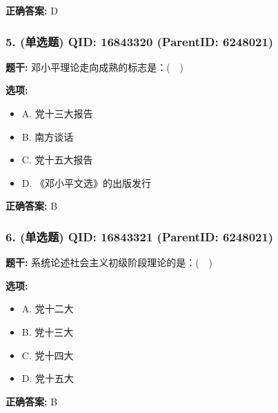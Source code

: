 \documentclass[12pt,UTF8]{ctexart}
\begin{document}
\textbf{正确答案:}
D

\vspace{0.3em}\hrulefill\vspace{0.7em}

\subsubsection*{5. (单选题) \small QID: 16843320 (ParentID: 6248021)}

\textbf{题干:}
邓小平理论走向成熟的标志是：(  )



\textbf{选项:}
\begin{itemize}[leftmargin=*]

  \item A. 党十三大报告

  \item B. 南方谈话

  \item C. 党十五大报告

  \item D. 《邓小平文选》的出版发行

\end{itemize}

\textbf{正确答案:}
B

\vspace{0.3em}\hrulefill\vspace{0.7em}

\subsubsection*{6. (单选题) \small QID: 16843321 (ParentID: 6248021)}

\textbf{题干:}
系统论述社会主义初级阶段理论的是：(  )



\textbf{选项:}
\begin{itemize}[leftmargin=*]

  \item A. 党十二大

  \item B. 党十三大

  \item C. 党十四大

  \item D. 党十五大

\end{itemize}

\textbf{正确答案:}
B

\vspace{0.3em}\hrulefill\vspace{0.7em}
\end{document}
